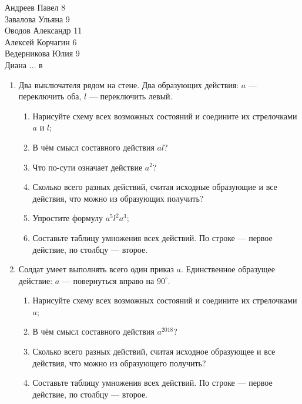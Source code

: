 \documentclass[a4paper, 12pt]{article}
\begin{document}
Андреев Павел 8 \\
Завалова Ульяна 9 \\
Оводов Александр 11 \\
Алексей Корчагин 6 \\
Ведерникова Юлия 9 \\
Диана ... в \\

\begin{enumerate}

  \item Два выключателя рядом на стене. Два образующих действия: $a$ — переключить оба, $l$ — переключить левый.
    \begin{enumerate}
      \item Нарисуйте схему всех возможных состояний и соедините их стрелочками $a$ и $l$;
      \item В чём смысл составного действия $al$?
      \item Что по-сути означает действие $a^2$?
      \item Сколько всего разных действий, считая исходные образующие и все действия, что можно из образующих получить?
      \item Упростите формулу $a^5l^2a^3$;
      \item Составьте таблицу умножения всех действий. По строке — первое действие, по столбцу — второе.
    \end{enumerate}

    
  \item Солдат умеет выполнять всего один приказ $a$. Единственное образущее действие: $a$ — повернуться вправо на $90^{\circ}$.    
    \begin{enumerate}
      \item Нарисуйте схему всех возможных состояний и соедините их стрелочками $a$;
      \item В чём смысл составного действия $a^{2018}$?
      \item Сколько всего разных действий, считая исходное образующее и все действия, что можно из образующего получить?
      \item Составьте таблицу умножения всех действий. По строке — первое действие, по столбцу — второе.
    \end{enumerate}


\end{enumerate}
\end{document}
